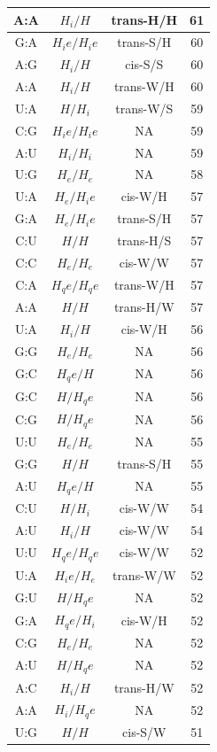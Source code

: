 \begin{center}
\begin{longtable}{c|c|c|c}
A:A & $H_i/H$ & trans-H/H & 61 \\  \hline
G:A & $H_ie/H_ie$ & trans-S/H & 60 \\  \hline
A:G & $H_i/H$ & cis-S/S & 60 \\  \hline
A:A & $H_i/H$ & trans-W/H & 60 \\  \hline
U:A & $H/H_i$ & trans-W/S & 59 \\  \hline
C:G & $H_ie/H_ie$ & NA & 59 \\  \hline
A:U & $H_i/H_i$ & NA & 59 \\  \hline
U:G & $H_e/H_e$ & NA & 58 \\  \hline
U:A & $H_e/H_ie$ & cis-W/H & 57 \\  \hline
G:A & $H_e/H_ie$ & trans-S/H & 57 \\  \hline
C:U & $H/H$ & trans-H/S & 57 \\  \hline
C:C & $H_e/H_e$ & cis-W/W & 57 \\  \hline
C:A & $H_qe/H_qe$ & trans-W/H & 57 \\  \hline
A:A & $H/H$ & trans-H/W & 57 \\  \hline
U:A & $H_i/H$ & cis-W/H & 56 \\  \hline
G:G & $H_e/H_e$ & NA & 56 \\  \hline
G:C & $H_qe/H$ & NA & 56 \\  \hline
G:C & $H/H_qe$ & NA & 56 \\  \hline
C:G & $H/H_qe$ & NA & 56 \\  \hline
U:U & $H_e/H_e$ & NA & 55 \\  \hline
G:G & $H/H$ & trans-S/H & 55 \\  \hline
A:U & $H_qe/H$ & NA & 55 \\  \hline
C:U & $H/H_i$ & cis-W/W & 54 \\  \hline
A:U & $H_i/H$ & cis-W/W & 54 \\  \hline
U:U & $H_qe/H_qe$ & cis-W/W & 52 \\  \hline
U:A & $H_ie/H_e$ & trans-W/W & 52 \\  \hline
G:U & $H/H_qe$ & NA & 52 \\  \hline
G:A & $H_qe/H_i$ & cis-W/H & 52 \\  \hline
C:G & $H_e/H_e$ & NA & 52 \\  \hline
A:U & $H/H_qe$ & NA & 52 \\  \hline
A:C & $H_i/H$ & trans-H/W & 52 \\  \hline
A:A & $H_i/H_qe$ & NA & 52 \\  \hline
U:G & $H/H$ & cis-S/W & 51 \\  \hline

\end{longtable}
\end{center}
